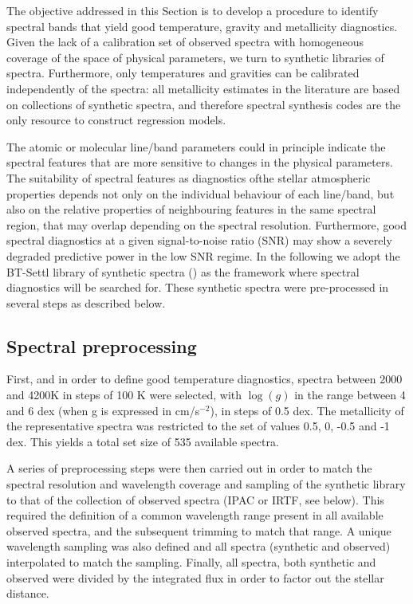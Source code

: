 The objective addressed in this Section is to develop a procedure to
identify spectral bands that yield good temperature, gravity and
metallicity diagnostics. Given the lack of a calibration set of
observed spectra with homogeneous coverage of the space of physical
parameters, we turn to synthetic libraries of spectra. Furthermore,
only temperatures and gravities can be calibrated independently of the
spectra: all metallicity estimates in the literature are based on
collections of synthetic spectra, and therefore spectral synthesis
codes are the only resource to construct regression models.

The atomic or molecular line/band parameters could in principle
indicate the spectral features that are more sensitive to changes in
the physical parameters. The suitability of spectral features as
diagnostics ofthe stellar atmospheric properties depends not only on
the individual behaviour of each line/band, but also on the relative
properties of neighbouring features in the same spectral region, that
may overlap depending on the spectral resolution. Furthermore, good
spectral diagnostics at a given signal-to-noise ratio (SNR) may show a
severely degraded predictive power in the low SNR regime. In the
following we adopt the BT-Settl library of synthetic spectra
(\cite{2013MSAIS..24..128A}) as the framework where spectral
diagnostics will be searched for. These synthetic spectra were
pre-processed in several steps as described below.

\subsection{Spectral preprocessing}

First, and in order to define good temperature diagnostics, spectra
between 2000 and 4200K in steps of 100 K were selected, with $\log(g)$
in the range between 4 and 6 dex (when g is expressed in cm/s$^{-2}$),
in steps of 0.5 dex. The metallicity of the representative spectra was
restricted to the set of values 0.5, 0, -0.5 and -1 dex.  This yields a total set size
of 535 available spectra.

A series of preprocessing steps were then carried out in order to
match the spectral resolution and wavelength coverage and sampling of
the synthetic library to that of the collection of observed spectra
(IPAC or IRTF, see below). This required the definition of a common
wavelength range present in all available observed spectra, and the
subsequent trimming to match that range. A unique wavelength sampling
was also defined and all spectra (synthetic and observed) interpolated
to match the sampling. Finally, all spectra, both synthetic and
observed were divided by the integrated flux in order to factor out
the stellar distance.

